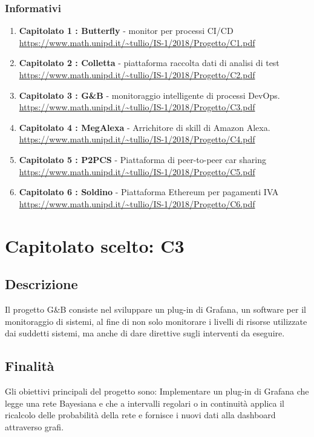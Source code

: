 \documentclass{article}
\begin{document}
		\subsubsection{Informativi}
			\begin{enumerate}
				\item \textbf{Capitolato 1 : Butterfly} - monitor per processi CI/CD \newline 	\url{ https://www.math.unipd.it/~tullio/IS-1/2018/Progetto/C1.pdf}
				\item \textbf{Capitolato 2 : Colletta} - piattaforma raccolta dati di analisi di test \newline \url{https://www.math.unipd.it/~tullio/IS-1/2018/Progetto/C2.pdf}
				\item \textbf{Capitolato 3 : G\&B} - monitoraggio intelligente di processi DevOps. \newline \url{https://www.math.unipd.it/~tullio/IS-1/2018/Progetto/C3.pdf}
				\item \textbf{Capitolato 4 : MegAlexa} - Arrichitore di skill di Amazon Alexa. \newline \url{https://www.math.unipd.it/~tullio/IS-1/2018/Progetto/C4.pdf}
				\item \textbf{Capitolato 5 : P2PCS} - Piattaforma di peer-to-peer car sharing \newline \url{https://www.math.unipd.it/~tullio/IS-1/2018/Progetto/C5.pdf}
			    \item \textbf{Capitolato 6 : Soldino} - Piattaforma Ethereum per pagamenti IVA \newline \url{https://www.math.unipd.it/~tullio/IS-1/2018/Progetto/C6.pdf}
			\end{enumerate}
			
\newpage
    \section{Capitolato scelto: C3}
        \subsection{Descrizione}
        Il progetto G\&B consiste nel sviluppare un plug-in di Grafana, un software per il monitoraggio di sistemi, al fine di non solo monitorare i livelli di risorse utilizzate dai suddetti sistemi, ma anche di dare direttive sugli interventi da eseguire.
        \subsection{Finalità}
        	Gli obiettivi principali del progetto sono: Implementare un plug-in di Grafana che legge una rete Bayesiana e che a intervalli regolari o in continuità applica il ricalcolo delle probabilità della rete e fornisce i nuovi dati alla dashboard attraverso grafi.
\end{document}
